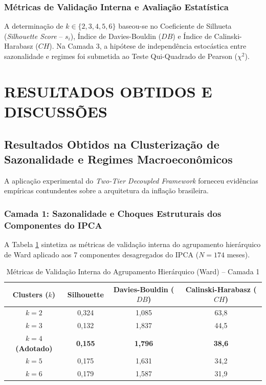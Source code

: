\documentclass[10pt,twoside]{article}
\begin{document}
\subsubsection{Métricas de Validação Interna e Avaliação Estatística}
A determinação de $k \in \{2, 3, 4, 5, 6\}$ baseou-se no Coeficiente de Silhueta (\textit{Silhouette Score} -- $s_i$), Índice de Davies-Bouldin ($DB$) e Índice de Calinski-Harabasz ($CH$). Na Camada 3, a hipótese de independência estocástica entre sazonalidade e regimes foi submetida ao Teste Qui-Quadrado de Pearson ($\chi^2$).

\section{RESULTADOS OBTIDOS E DISCUSSÕES}

\subsection{Resultados Obtidos na Clusterização de Sazonalidade e Regimes Macroeconômicos}
A aplicação experimental do \textit{Two-Tier Decoupled Framework} forneceu evidências empíricas contundentes sobre a arquitetura da inflação brasileira.

\subsubsection{Camada 1: Sazonalidade e Choques Estruturais dos Componentes do IPCA}
A Tabela \ref{tab:metricas_camada1} sintetiza as métricas de validação interna do agrupamento hierárquico de Ward aplicado aos 7 componentes desagregados do IPCA ($N = 174$ meses).

\begin{table}[H]
\centering
\caption{Métricas de Validação Interna do Agrupamento Hierárquico (Ward) -- Camada 1}
\label{tab:metricas_camada1}
\small
\begin{tabular}{cccc}
\toprule
\textbf{Clusters ($k$)} & \textbf{Silhouette} & \textbf{Davies-Bouldin ($DB$)} & \textbf{Calinski-Harabasz ($CH$)} \\
\midrule
$k = 2$ & 0,324 & 1,085 & 63,8 \\
$k = 3$ & 0,132 & 1,837 & 44,5 \\
\textbf{$k = 4$ (Adotado)} & \textbf{0,155} & \textbf{1,796} & \textbf{38,6} \\
$k = 5$ & 0,175 & 1,631 & 34,2 \\
$k = 6$ & 0,179 & 1,587 & 31,9 \\
\bottomrule
\end{tabular}
\end{table}
\end{document}
